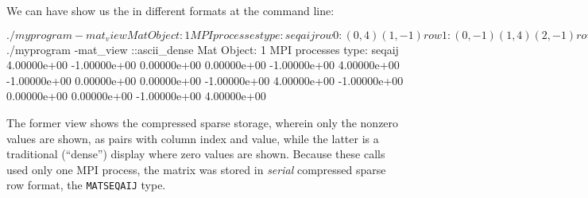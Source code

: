 \begin{marginfigure}
\bigskip
\caption{A parallel \pMat layout on two processes.  Blank entries are zeros, which are not stored because of ``compressed sparse'' storage.}
\label{fig:mpitwomatlayout}
\end{marginfigure}

We can have \PETSc show us the \pMat in different formats at the command line:
\begin{cline}
$ ./myprogram -mat_view
Mat Object: 1 MPI processes
  type: seqaij
row 0: (0, 4)  (1, -1)
row 1: (0, -1)  (1, 4)  (2, -1)
row 2: (1, -1)  (2, 4)  (3, -1)
row 3: (2, -1)  (3, 4)
$ ./myprogram -mat_view ::ascii_dense
Mat Object: 1 MPI processes
  type: seqaij
 4.00000e+00  -1.00000e+00  0.00000e+00  0.00000e+00
 -1.00000e+00  4.00000e+00  -1.00000e+00  0.00000e+00
 0.00000e+00  -1.00000e+00  4.00000e+00  -1.00000e+00
 0.00000e+00  0.00000e+00  -1.00000e+00  4.00000e+00
\end{cline}
The former view shows the compressed sparse storage, wherein only the nonzero values are shown, as pairs with column index and value, while the latter is a traditional (``dense'') display where zero values are shown.  Because these calls used only one MPI process, the matrix was stored in \emph{serial} compressed sparse row format, the \texttt{MATSEQAIJ} type.

